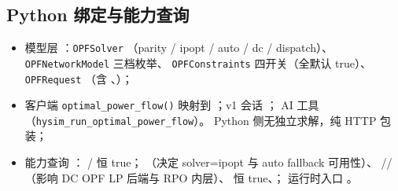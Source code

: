 \subsection{Python 绑定与能力查询}
\begin{itemize}
  \item 模型层 ：\texttt{OPFSolver}
        （parity / ipopt / auto / dc / dispatch）、\texttt{OPFNetworkModel} 三档枚举、
        \texttt{OPFConstraints} 四开关（全默认 true）、\texttt{OPFRequest}
        （含 、）；
  \item 客户端  \texttt{optimal\_power\_flow()} 映射到
        ；v1 会话 ；
        AI 工具 （\texttt{hysim\_run\_optimal\_power\_flow}）。
        Python 侧无独立求解，纯 HTTP 包装；
  \item 能力查询 ：
        / 恒 true；
        （决定 solver=ipopt 与 auto fallback 可用性）、
        //（影响 DC OPF LP 后端与
        RPO 内层）、 恒 true、；
        运行时入口 。
\end{itemize}

